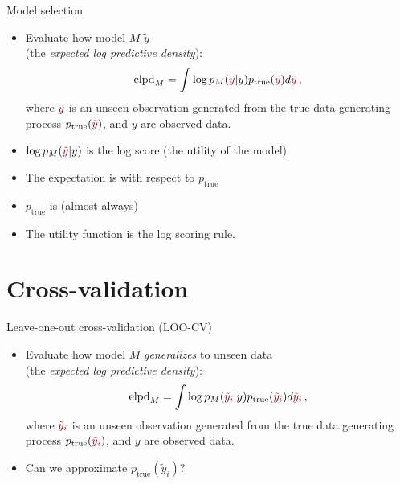 \documentclass[10pt]{beamer}
\begin{document}
\begin{frame}{Model selection}

\begin{itemize}
\item Evaluate how model $M$  $\tilde{y}$\\(the \emph{expected log predictive density}):
\[
\text{elpd}_M= \int \log p_M({\color{uured}\tilde{y}}|y) p_\text{true}({\color{uured}\tilde{y}}) d{\color{uured}\tilde{y}}\,,
\]
where ${\color{uured}\tilde{y}}$ is an unseen observation generated from the true data generating process $p_\text{true}({\color{uured}\tilde{y}})$, and $y$ are observed data.
\item $\log p_M({\color{uured}\tilde{y}}|y)$ is the log score (the utility of the model)
\pause
\item The expectation is with respect to $p_\text{true}$
\pause
\item $p_\text{true}$ is (almost always) 
\pause
\item The utility function is the log scoring rule.
\end{itemize}
\end{frame}




\section{Cross-validation}
\frame{\sectionpage}

\begin{frame}{Leave-one-out cross-validation (LOO-CV)}
\begin{itemize}
\item Evaluate how model $M$ \emph{generalizes} to unseen data \\(the \emph{expected log predictive density}):
\[
\text{elpd}_M= \int \log p_M({\color{uured}\tilde{y}_i}|y) p_\text{true}({\color{uured}\tilde{y}_i}) d{\color{uured}\tilde{y}_i}\,,
\]
where ${\color{uured}\tilde{y}_i}$ is an unseen observation generated from the true data generating process $p_\text{true}({\color{uured}\tilde{y}_i})$, and $y$ are observed data.
\pause
\item Can we approximate $p_\text{true}(\tilde{y}_i)$?
\end{itemize}
\end{frame}
\end{document}
